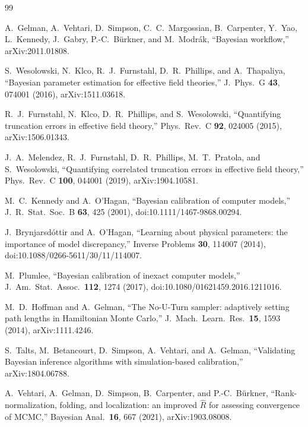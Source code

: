 \documentclass[11pt]{article}
\begin{document}
\small
\begin{thebibliography}{99}

A.~Gelman, A.~Vehtari, D.~Simpson, C.~C.~Margossian, B.~Carpenter,
Y.~Yao, L.~Kennedy, J.~Gabry, P.-C.~B\"urkner, and M.~Modr\'ak,
``Bayesian workflow,''
arXiv:2011.01808.

S.~Wesolowski, N.~Klco, R.~J.~Furnstahl, D.~R.~Phillips, and A.~Thapaliya,
``Bayesian parameter estimation for effective field theories,''
J.\ Phys.\ G \textbf{43}, 074001 (2016), arXiv:1511.03618.

R.~J.~Furnstahl, N.~Klco, D.~R.~Phillips, and S.~Wesolowski,
``Quantifying truncation errors in effective field theory,''
Phys.\ Rev.\ C \textbf{92}, 024005 (2015), arXiv:1506.01343.

J.~A.~Melendez, R.~J.~Furnstahl, D.~R.~Phillips, M.~T.~Pratola, and
S.~Wesolowski,
``Quantifying correlated truncation errors in effective field theory,''
Phys.\ Rev.\ C \textbf{100}, 044001 (2019), arXiv:1904.10581.

M.~C.~Kennedy and A.~O'Hagan,
``Bayesian calibration of computer models,''
J.\ R.\ Stat.\ Soc.\ B \textbf{63}, 425 (2001),
doi:10.1111/1467-9868.00294.

J.~Brynjarsd\'ottir and A.~O'Hagan,
``Learning about physical parameters: the importance of model discrepancy,''
Inverse Problems \textbf{30}, 114007 (2014),
doi:10.1088/0266-5611/30/11/114007.

M.~Plumlee,
``Bayesian calibration of inexact computer models,''
J.\ Am.\ Stat.\ Assoc.\ \textbf{112}, 1274 (2017),
doi:10.1080/01621459.2016.1211016.

M.~D.~Hoffman and A.~Gelman,
``The No-U-Turn sampler: adaptively setting path lengths in Hamiltonian Monte
Carlo,''
J.\ Mach.\ Learn.\ Res.\ \textbf{15}, 1593 (2014), arXiv:1111.4246.

S.~Talts, M.~Betancourt, D.~Simpson, A.~Vehtari, and A.~Gelman,
``Validating Bayesian inference algorithms with simulation-based
calibration,''
arXiv:1804.06788.

A.~Vehtari, A.~Gelman, D.~Simpson, B.~Carpenter, and P.-C.~B\"urkner,
``Rank-normalization, folding, and localization: an improved
\(\widehat R\) for assessing convergence of MCMC,''
Bayesian Anal.\ \textbf{16}, 667 (2021), arXiv:1903.08008.


\end{thebibliography}
\end{document}

